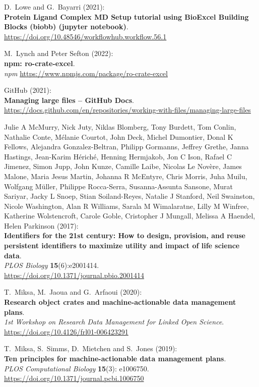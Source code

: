 \begin{thebibliography}{9}
D.~Lowe and G.~Bayarri (2021):\\
\textbf{Protein Ligand Complex MD Setup tutorial using BioExcel Building
Blocks (biobb) (jupyter notebook)}.\\
\url{https://doi.org/10.48546/workflowhub.workflow.56.1}

M.~Lynch and Peter Sefton (2022):\\
\textbf{npm: ro-crate-excel}.\\
\emph{npm} \url{https://www.npmjs.com/package/ro-crate-excel}

GitHub (2021):\\
\textbf{Managing large files -- GitHub Docs}.\\
\url{https://docs.github.com/en/repositories/working-with-files/managing-large-files}

Julie A McMurry, Nick Juty, Niklas Blomberg, Tony Burdett, Tom
Conlin, Nathalie Conte, Mélanie Courtot, John Deck, Michel Dumontier,
Donal K Fellows, Alejandra Gonzalez-Beltran, Philipp Gormanns, Jeffrey
Grethe, Janna Hastings, Jean-Karim Hériché, Henning Hermjakob, Jon C
Ison, Rafael C Jimenez, Simon Jupp, John Kunze, Camille Laibe, Nicolas
Le Novère, James Malone, Maria Jesus Martin, Johanna R McEntyre, Chris
Morris, Juha Muilu, Wolfgang Müller, Philippe Rocca-Serra,
Susanna-Assunta Sansone, Murat Sariyar, Jacky L Snoep, Stian
Soiland-Reyes, Natalie J Stanford, Neil Swainston, Nicole Washington,
Alan R Williams, Sarala M Wimalaratne, Lilly M Winfree, Katherine
Wolstencroft, Carole Goble, Cristopher J Mungall, Melissa A Haendel,
Helen Parkinson (2017):\\
\textbf{Identifiers for the 21st century: How to design, provision, and
reuse persistent identifiers to maximize utility and impact of life
science data}.\\
\emph{PLOS Biology} \textbf{15}(6):e2001414.\\
\url{https://doi.org/10.1371/journal.pbio.2001414}

T.~Miksa, M.~Jaoua and G.~Arfaoui (2020):\\
\textbf{Research object crates and machine-actionable data management
plans}.\\
\emph{1st Workshop on Research Data Management for Linked Open
Science}.\\
\url{https://doi.org/10.4126/frl01-006423291}

T.~Miksa, S.~Simms, D.~Mietchen and S.~Jones (2019):\\
\textbf{Ten principles for machine-actionable data management plans}.\\
\emph{PLOS Computational Biology} \textbf{15}(3): e1006750.\\
\url{https://doi.org/10.1371/journal.pcbi.1006750}


\end{thebibliography}
